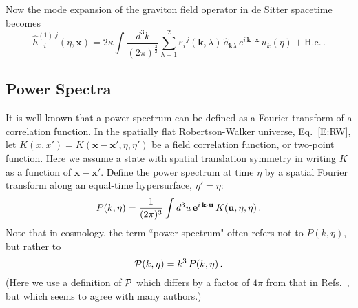 \documentclass[preprint,prd,showpacs,superscriptaddress]{revtex4}
\begin{document}
Now the mode expansion of the graviton field operator in de Sitter spacetime becomes
\begin{equation}\label{E:h1}
\hat{h}^{(1)\;j}_{\;\;\; i}(\eta,\mathbf{x})=2\kappa\int\!\frac{d^{3}k}{(2\pi)^{\frac{3}{2}}}
\sum_{\lambda=1}^{2}\varepsilon_{i}{}^{j}(\mathbf{k},\lambda)\,\hat{a}_{\mathbf{k}\lambda}\,e^{i\,\mathbf{k}\cdot\mathbf{x}}
\,u_k(\eta)+\text{H.c.}\,.
\end{equation}


\subsection{Power Spectra}

It is well-known that a power spectrum can be defined as a Fourier transform of a correlation function. In 
the spatially flat Robertson-Walker universe, Eq.~\eqref{E:RW}, let $K(x,x') = K(\mathbf{x} - \mathbf{x'}, \eta,\eta')$
be a field correlation function, or two-point function. Here we assume a state with spatial translation symmetry
in writing  $K$ as a function of $\mathbf{x} - \mathbf{x'}$. Define the power spectrum at time $\eta$ by a spatial
Fourier transform along an equal-time hypersurface, $\eta' = \eta$:
\begin{equation}
P(k,\eta) = \frac{1}{(2\pi)^3} \int d^3u \, {\bf e}^{i\,\mathbf{k}\cdot\mathbf{u} } \,  K(\mathbf{u}, \eta,\eta) \,.
\label{E:power}
\end{equation}
Note that in cosmology, the term ``power spectrum" often refers not to $P(k,\eta)$, but rather to
 \begin{equation}
{\cal P}(k,\eta) =  k^3 \, P(k,\eta) \,.
\end{equation}
(Here we use a definition of ${\cal P}$ which differs by a factor of $4\pi$ from that in Refs.~\cite{FMNWW10,WHFN11},
but which seems to agree with many authors.)
\end{document}
